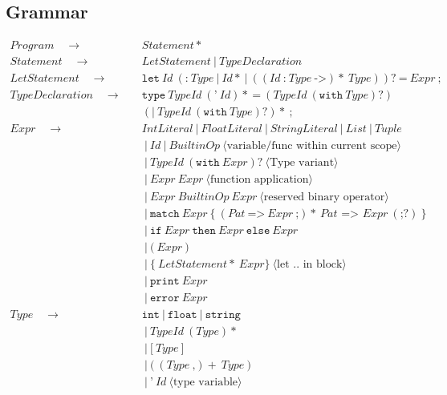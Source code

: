 \documentclass[a4paper, 12pt]{article}
\newcommand{\sepbar}{\: | \:}	%
\newcommand{\substo}{\quad\rightarrow\quad}
\begin{document}
\subsection{Grammar}
\begin{align*}
Program \substo& Statement*\\
Statement \substo& LetStatement \sepbar TypeDeclaration\\
LetStatement \substo& \texttt{let}\: Id \: (\texttt{:}\: Type\sepbar Id* \sepbar ((Id\: \texttt{:}\:Type\:\texttt{->})*\:Type))?\:\texttt{=}\: Expr\:\texttt{;}\\
TypeDeclaration \substo& \texttt{type}\: TypeId\: (\texttt{'}\: Id)*\: \texttt{=} \: (TypeId \: (\texttt{with}\: Type)?)\\
&(\texttt{|}\:TypeId \: (\texttt{with}\: Type)?)*\:\texttt{;}\\
Expr\substo& IntLiteral \sepbar FloatLiteral \sepbar StringLiteral \sepbar List \sepbar Tuple\\
& \sepbar Id \sepbar BuiltinOp\:\langle\text{variable/func within current scope}\rangle\\
& \sepbar TypeId\: (\texttt{with}\: Expr)?\: \langle\text{Type variant}\rangle\\
& \sepbar Expr\:Expr\:\langle\text{function application}\rangle\\
& \sepbar Expr \: BuiltinOp \: Expr\:\langle\text{reserved binary operator}\rangle \\
& \sepbar \texttt{match}\: Expr \: \texttt{\{} \: (Pat \: \texttt{=>}\: Expr\: \texttt{;})*\: Pat\texttt{ => } Expr \: (\texttt{;}?) \: \texttt{\}} \\
& \sepbar \texttt{if}\: Expr \: \texttt{then} \: Expr \: \texttt{else} \: Expr \\
& \sepbar \texttt{(}\: Expr \:\texttt{)}\\
& \sepbar \texttt{\{}\: LetStatement*\: Expr\texttt{\}} \:\langle \text{let .. in block}\rangle\\
& \sepbar \texttt{print} \: Expr \\
& \sepbar \texttt{error} \: Expr \\
Type \substo& \texttt{int} \sepbar \texttt{float} \sepbar \texttt{string}\\
& \sepbar TypeId\: (Type)*\\
& \sepbar \texttt{[}\:Type\:\texttt{]}\\
& \sepbar \texttt{(} \: (Type\: \texttt{,} )+\: Type\: \texttt{)}\\
& \sepbar \texttt{'}\:Id \: \langle\text{type variable}\rangle\\

\end{align*}
\end{document}
